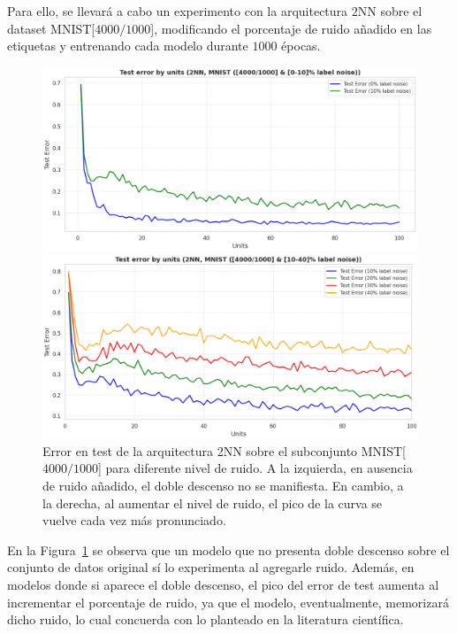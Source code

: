 Para ello, se llevará a cabo un experimento con la arquitectura $2$NN sobre el dataset MNIST[$4000/1000$], modificando el porcentaje de ruido añadido en las etiquetas y entrenando cada modelo durante $1000$ épocas.\newline

\begin{figure}[h]
    \centering
    \begin{minipage}{0.45\textwidth}
        \centering
        \includegraphics[width=\linewidth]{img/experiments/noise-wise-dd1.png}
    \end{minipage}
    \begin{minipage}{0.45\textwidth}
        \centering
        \includegraphics[width=\linewidth]{img/experiments/noise-wise-dd2.png}
    \end{minipage}
    \caption[Doble descenso para distintos niveles de ruido.]{Error en test de la arquitectura 2NN sobre el subconjunto MNIST[$4000/1000$] para diferente nivel de ruido. A la izquierda, en ausencia de ruido añadido, el doble descenso no se manifiesta. En cambio, a la derecha, al aumentar el nivel de ruido, el pico de la curva se vuelve cada vez más pronunciado.}\label{fig:noise-wise-dd}
\end{figure}

En la Figura~\ref{fig:noise-wise-dd} se observa que un modelo que no presenta doble descenso sobre el conjunto de datos original sí lo experimenta al agregarle ruido. Además, en modelos donde si aparece el doble descenso, el pico del error de test aumenta al incrementar el porcentaje de ruido, ya que el modelo, eventualmente, memorizará dicho ruido, lo cual concuerda con lo planteado en la literatura científica.\newline

